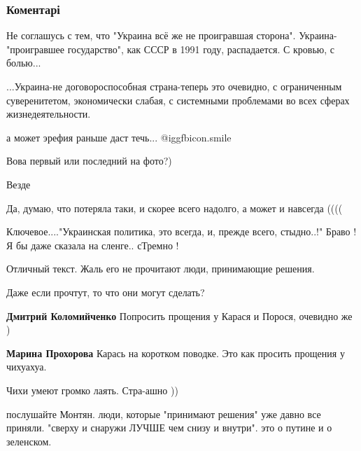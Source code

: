  
 
 
 
 
\subsubsection{Коментарі}

\begin{itemize} %

Не соглашусь с тем, что "Украина всё же не проигравшая сторона".
Украина-"проигравшее государство", как СССР в 1991 году, распадается. С кровью,
с болью...

...Украина-не договороспособная страна-теперь это очевидно, с ограниченным
суверенитетом, экономически слабая, с системными проблемами во всех сферах
жизнедеятельности.

а может эрефия раньше даст течь...  @igg{fbicon.smile} 

Вова первый или последний на фото?)

Везде

Да, думаю, что потеряла таки, и скорее всего надолго, а может и навсегда ((((

Ключевое...."Украинская политика, это всегда, и, прежде всего, стыдно..!" Браво ! Я бы даже сказала на сленге.. сТремно !

Отличный текст. Жаль его не прочитают люди, принимающие решения.

\begin{itemize} %
Даже если прочтут, то что они могут сделать?

\textbf{Дмитрий Коломийченко} Попросить прощения у Карася и Порося, очевидно же )

\textbf{Марина Прохорова} Карась на коротком поводке. Это как просить прощения у чихуахуа.

Чихи умеют громко лаять. Стра-ашно ))


послушайте Монтян. люди, которые "принимают решения" уже давно все приняли.
"сверху и снаружи ЛУЧШЕ чем снизу и внутри". это о путине и о зеленском.


\end{itemize}
\end{itemize}
